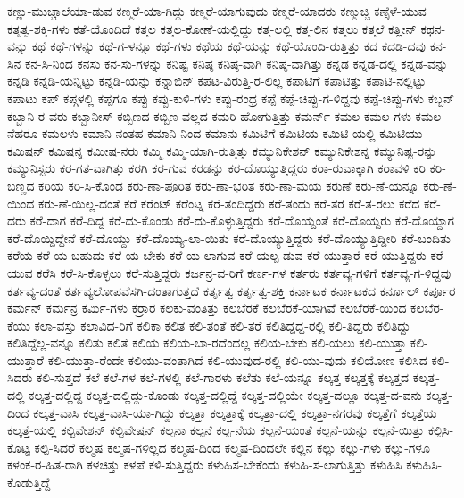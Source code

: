 {ಕಣ್ಣು-ಮುಚ್ಚಾಲೆಯಾ-ಡುವ
ಕಣ್ಮರೆ-ಯಾ-ಗಿದ್ದು
ಕಣ್ಮರೆ-ಯಾಗುವುದು
ಕಣ್ಮರೆ-ಯಾದರು
ಕಣ್ಮುಚ್ಚಿ
ಕಣ್ಸೆಳೆ-ಯುವ
ಕತೃತ್ವ-ಶಕ್ತಿ-ಗಳು
ಕತೆ-ಯೊಂದಿದೆ
ಕತ್ತಲ
ಕತ್ತಲ-ಕೋಣೆ-ಯಲ್ಲಿದ್ದು
ಕತ್ತ-ಲಲ್ಲಿ
ಕತ್ತ-ಲಿನ
ಕತ್ತಲು
ಕತ್ತಲೆ
ಕತ್ಲೀನ್
ಕಥನ-ವನ್ನು
ಕಥೆ
ಕಥೆ-ಗಳನ್ನು
ಕಥೆ-ಗ-ಳನ್ನೂ
ಕಥೆ-ಗಳು
ಕಥೆಯ
ಕಥೆ-ಯನ್ನು
ಕಥೆ-ಯೊಂದಿ-ರುತ್ತಿತ್ತು
ಕದ
ಕದಡಿ-ದವು
ಕನ-ಸಿನ
ಕನ-ಸಿ-ನಿಂದ
ಕನಸು
ಕನ-ಸು-ಗಳನ್ನು
ಕನಿಷ್ಟ
ಕನಿಷ್ಠ
ಕನಿಷ್ಠ-ವಾಗಿ
ಕನಿಷ್ಠ-ವಾಗಿತ್ತು
ಕನ್ನಡ
ಕನ್ನಡ-ದಲ್ಲಿ
ಕನ್ನಡ-ವನ್ನು
ಕನ್ನಡಿ
ಕನ್ನಡಿ-ಯನ್ನಿಟ್ಟು
ಕನ್ನಡಿ-ಯನ್ನು
ಕನ್ನಾಬಿನ್
ಕಪಟ-ವಿರುತ್ತಿ-ರ-ಲಿಲ್ಲ
ಕಪಾಟಿಗೆ
ಕಪಾಟಿತ್ತು
ಕಪಾಟಿ-ನಲ್ಲಿಟ್ಟು
ಕಪಾಟು
ಕಪ್
ಕಪ್ಗಳಲ್ಲಿ
ಕಪ್ಪಗೂ
ಕಪ್ಪು
ಕಪ್ಪು-ಕುಳಿ-ಗಳು
ಕಪ್ಪು-ರಂಧ್ರ
ಕಪ್ಪೆ
ಕಪ್ಪೆ-ಚಿಪ್ಪು-ಗ-ಳಿದ್ದವು
ಕಪ್ಪೆ-ಚಿಪ್ಪು-ಗಳು
ಕಬ್ಬನ್
ಕಬ್ಬಾನಿ-ರ-ವರು
ಕಬ್ಬಾನೀಸ್
ಕಬ್ಬಿಣದ
ಕಬ್ಬಿಣ-ವಲ್ಲದ
ಕಮರಿ-ಹೋಗುತ್ತಿತ್ತು
ಕಮರ್ನ್
ಕಮಲ
ಕಮಲ-ಗಳು
ಕಮಲ-ನೆಹರೂ
ಕಮಲಳು
ಕಮಾನಿ-ನಂತಹ
ಕಮಾನಿ-ನಿಂದ
ಕಮಾನು
ಕಮಿಟಿಗೆ
ಕಮಿಟಿಯ
ಕಮಿಟಿ-ಯಲ್ಲಿ
ಕಮಿಟಿಯು
ಕಮಿಷನ್
ಕಮಿಷನ್ನ
ಕಮೀಷ-ನರು
ಕಮ್ಮಿ
ಕಮ್ಮಿ-ಯಾಗಿ-ರುತ್ತಿತ್ತು
ಕಮ್ಯುನಿಕೇಶನ್
ಕಮ್ಯುನಿಕೇಶನ್ನ
ಕಮ್ಯುನಿಷ್ಟ-ರನ್ನು
ಕಮ್ಯುನಿಸ್ಟರು
ಕರ-ಗತ-ವಾಗಿತ್ತು
ಕರಗಿ
ಕರ-ಗುವ
ಕರಡನ್ನು
ಕರ-ದೊಯ್ಯುತ್ತಿದ್ದರು
ಕರಾ-ರುವಾಕ್ಕಾಗಿ
ಕರಾವಳಿ
ಕರಿ
ಕರಿ-ಬಣ್ಣದ
ಕರಿಯ
ಕರಿ-ಸಿ-ಕೊಂಡ
ಕರು-ಣಾ-ಪೂರಿತ
ಕರು-ಣಾ-ಭರಿತ
ಕರು-ಣಾ-ಮಯ
ಕರುಣೆ
ಕರು-ಣೆ-ಯನ್ನೂ
ಕರು-ಣೆ-ಯಿಂದ
ಕರು-ಣೆ-ಯಿಲ್ಲ-ದಂತೆ
ಕರೆ
ಕರೆಂಟ್
ಕರೆಂಟ್ನ
ಕರೆ-ತಂದಿದ್ದರು
ಕರೆ-ತಂದು
ಕರೆ-ತರ
ಕರೆ-ತ-ರಲು
ಕರೆದ
ಕರೆ-ದರು
ಕರೆ-ದಾಗ
ಕರೆ-ದಿದ್ದ
ಕರೆ-ದು-ಕೊಂಡು
ಕರೆ-ದು-ಕೊಳ್ಳುತ್ತಿದ್ದರು
ಕರೆ-ದೊಯ್ದಂತೆ
ಕರೆ-ದೊಯ್ದರು
ಕರೆ-ದೊಯ್ದಾಗ
ಕರೆ-ದೊಯ್ದಿದ್ದೇನೆ
ಕರೆ-ದೊಯ್ದು
ಕರೆ-ದೊಯ್ಯ-ಲಾ-ಯಿತು
ಕರೆ-ದೊಯ್ಯುತ್ತಿದ್ದರು
ಕರೆ-ದೊಯ್ಯುತ್ತಿದ್ದೀರಿ
ಕರೆ-ಬಂದಿತು
ಕರೆಯ
ಕರೆ-ಯ-ಬಹುದು
ಕರೆ-ಯ-ಬೇಕು
ಕರೆ-ಯ-ಲಾಗುವ
ಕರೆ-ಯಲ್ಪ-ಡುವ
ಕರೆ-ಯುತ್ತಾರೆ
ಕರೆ-ಯುತ್ತಿದ್ದರು
ಕರೆ-ಯುವ
ಕರೆಸಿ
ಕರೆ-ಸಿ-ಕೊಳ್ಳಲು
ಕರೆ-ಸುತ್ತಿದ್ದರು
ಕರ್ಜನ್ರ-ವ-ರಿಗೆ
ಕರ್ಣ-ಗಳ
ಕರ್ತರು
ಕರ್ತವ್ಯ-ಗಳಿಗೆ
ಕರ್ತವ್ಯ-ಗ-ಳಿದ್ದವು
ಕರ್ತವ್ಯ-ದಂತೆ
ಕರ್ತವ್ಯಲೋಪವೆಸಗಿ-ದಂತಾಗುತ್ತದೆ
ಕರ್ತೃತ್ವ
ಕರ್ತೃತ್ವ-ಶಕ್ತಿ
ಕರ್ನಾಟಕ
ಕರ್ನಾಟಕದ
ಕರ್ನೂಲ್
ಕರ್ಪೂರ
ಕರ್ಮನ್
ಕರ್ಮನ್ರ
ಕರ್ಮಿ-ಗಳು
ಕರ್ರಾರ
ಕಲಕು-ವಂತಿತ್ತು
ಕಲಬೆರಕೆ
ಕಲಬೆರಕೆ-ಯಾಗಿವೆ
ಕಲಬೆರಕೆ-ಯಿಂದ
ಕಲಬೆರ-ಕೆಯು
ಕಲಾ-ವಸ್ತು
ಕಲಾವಿದ-ರಿಗೆ
ಕಲಿಕಾ
ಕಲಿತ
ಕಲಿ-ತಂತೆ
ಕಲಿ-ತರೆ
ಕಲಿತಿದ್ದದ್ದ-ರಲ್ಲಿ
ಕಲಿ-ತಿದ್ದರು
ಕಲಿತಿದ್ದು
ಕಲಿತಿದ್ದೆಲ್ಲ-ವನ್ನೂ
ಕಲಿತು
ಕಲಿತೆ
ಕಲಿಯ
ಕಲಿಯ-ಬಾ-ರದೆಂದಲ್ಲ
ಕಲಿಯ-ಬೇಕು
ಕಲಿ-ಯಲು
ಕಲಿ-ಯುತ್ತಾ
ಕಲಿ-ಯುತ್ತಾರೆ
ಕಲಿ-ಯುತ್ತಾ-ರೆಂದೇ
ಕಲಿಯು-ವಂತಾಗಿದೆ
ಕಲಿ-ಯುವುದ-ರಲ್ಲಿ
ಕಲಿ-ಯು-ವುದು
ಕಲಿಯೋಣ
ಕಲಿಸಿದ
ಕಲಿ-ಸಿದರು
ಕಲಿ-ಸುತ್ತದೆ
ಕಲೆ
ಕಲೆ-ಗಳ
ಕಲೆ-ಗಳಲ್ಲಿ
ಕಲೆ-ಗಾರಳು
ಕಲೆತು
ಕಲೆ-ಯನ್ನೂ
ಕಲ್ಕತ್ತ
ಕಲ್ಕತ್ತಕ್ಕೆ
ಕಲ್ಕತ್ತದ
ಕಲ್ಕತ್ತ-ದಲ್ಲಿ
ಕಲ್ಕತ್ತ-ದಲ್ಲಿದ್ದ
ಕಲ್ಕತ್ತ-ದಲ್ಲಿದ್ದು-ಕೊಂಡು
ಕಲ್ಕತ್ತ-ದಲ್ಲಿದ್ದೆ
ಕಲ್ಕತ್ತ-ದಲ್ಲಿಯೇ
ಕಲ್ಕತ್ತ-ದಲ್ಲೂ
ಕಲ್ಕತ್ತ-ದ-ವನು
ಕಲ್ಕತ್ತ-ದಿಂದ
ಕಲ್ಕತ್ತ-ವಾಸಿ
ಕಲ್ಕತ್ತ-ವಾಸಿ-ಯಾ-ಗಿದ್ದು
ಕಲ್ಕತ್ತಾ
ಕಲ್ಕತ್ತಾಕ್ಕೆ
ಕಲ್ಕತ್ತಾ-ದಲ್ಲಿ
ಕಲ್ಕತ್ತಾ-ನಗರವು
ಕಲ್ಕತ್ತೆಗೆ
ಕಲ್ಕತ್ತೆಯ
ಕಲ್ಕತ್ತೆ-ಯಲ್ಲಿ
ಕಲ್ಟಿವೇಶನ್
ಕಲ್ಟಿವೇಷನ್
ಕಲ್ಪನಾ
ಕಲ್ಪನೆ
ಕಲ್ಪ-ನೆಯ
ಕಲ್ಪನೆ-ಯಂತೆ
ಕಲ್ಪನೆ-ಯನ್ನು
ಕಲ್ಪನೆ-ಯಿತ್ತು
ಕಲ್ಪಿಸಿ-ಕೊಟ್ಟ
ಕಲ್ಪಿ-ಸಿದರೆ
ಕಲ್ಮಷ
ಕಲ್ಮಷ-ಗಳಿಲ್ಲದ
ಕಲ್ಮಷ-ದಿಂದ
ಕಲ್ಮಷ-ದಿಂದಲೇ
ಕಲ್ಲಿನ
ಕಲ್ಲು
ಕಲ್ಲು-ಗಳು
ಕಲ್ಲು-ಗಳೂ
ಕಳಂಕ-ರ-ಹಿತ-ರಾಗಿ
ಕಳಚಿತ್ತು
ಕಳಪೆ
ಕಳಿ-ಸುತ್ತಿದ್ದರು
ಕಳುಹಿಸ-ಬೇಕೆಂದು
ಕಳುಹಿ-ಸ-ಲಾಗುತ್ತಿತ್ತು
ಕಳುಹಿಸಿ
ಕಳುಹಿಸಿ-ಕೊಡುತ್ತಿದ್ದೆ
}
